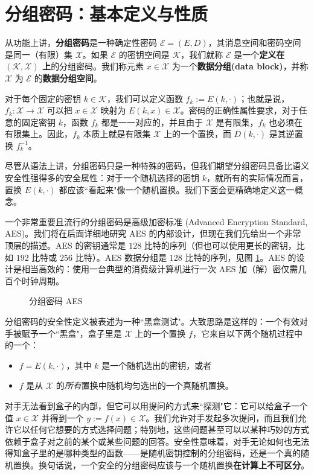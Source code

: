 \section{分组密码：基本定义与性质}\label{sec:4-1}

从功能上讲，\textbf{分组密码}是一种确定性密码 $\mathcal{E}=(E,D)$，其消息空间和密码空间是同一（有限）集 $\mathcal{X}$。如果 $\mathcal{E}$ 的密钥空间是 $\mathcal{K}$，我们就称 $\mathcal{E}$ 是一个\textbf{定义在 $(\mathcal{K},\mathcal{X})$ 上}的分组密码。我们称元素 $x\in\mathcal{X}$ 为一个\textbf{数据分组(data block)}，并称 $\mathcal{X}$ 为 $\mathcal{E}$ 的\textbf{数据分组空间}。

对于每个固定的密钥 $k\in\mathcal{K}$，我们可以定义函数 $f_k:=E(k,\cdot)$；也就是说，$f_k:\mathcal{X}\to\mathcal{X}$ 可以把 $x\in\mathcal{X}$ 映射为 $E(k,x)\in\mathcal{X}$。密码的正确性属性要求，对于任意的固定密钥 $k$，函数 $f_k$ 都是一一对应的，并且由于 $\mathcal{X}$ 是有限集，$f_k$ 也必须在有限集上。因此，$f_k$ 本质上就是有限集 $\mathcal{X}$ 上的一个置换，而 $D(k,\cdot)$ 是其逆置换 $f^{-1}_k$。

尽管从语法上讲，分组密码只是一种特殊的密码，但我们期望分组密码具备比语义安全性强得多的安全属性：对于一个随机选择的密钥 $k$，就所有的实际情况而言，置换 $E(k,\cdot)$ 都应该``看起来"像一个随机置换。我们下面会更精确地定义这一概念。

一个非常重要且流行的分组密码是高级加密标准 (Advanced Encryption Standard, AES)。我们将在后面详细地研究 AES 的内部设计，但现在我们先给出一个非常顶层的描述。AES 的密钥通常是 $128$ 比特的序列（但也可以使用更长的密钥，比如 $192$ 比特或 $256$ 比特）。AES 数据分组是 $128$ 比特的序列，见图 \ref{fig:4-1}。AES 的设计是相当高效的：使用一台典型的消费级计算机进行一次 AES 加（解）密仅需几百个时钟周期。

\begin{figure}
  \centering
  
  \caption{分组密码 AES}
  \label{fig:4-1}
\end{figure}

分组密码的安全性定义被表述为一种``黑盒测试"。大致思路是这样的：一个有效对手被赋予一个``黑盒"，盒子里是 $\mathcal{X}$ 上的一个置换 $f$，它来自以下两个随机过程中的一个：
\begin{itemize}
	\item $f=E(k,\cdot)$，其中 $k$ 是一个随机选出的密钥，或者
	\item $f$ 是从 $\mathcal{X}$ 的\emph{所有}置换中随机均匀选出的一个真随机置换。
\end{itemize}
对手无法看到盒子的内部，但它可以用提问的方式来``探测"它：它可以给盒子一个值 $x\in\mathcal{X}$ 并得到一个 $y:=f(x)\in\mathcal{X}$。我们允许对手发起多次提问，而且我们允许它以任何它想要的方式选择问题；特别地，这些问题甚至可以以某种巧妙的方式依赖于盒子对之前的某个或某些问题的回答。安全性意味着，对手无论如何也无法得知盒子里的是哪种类型的函数——是随机密钥控制的分组密码，还是一个真的随机置换。换句话说，一个安全的分组密码应该与一个随机置换\textbf{在计算上不可区分}。

